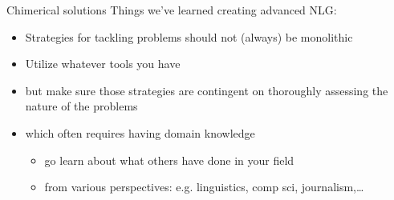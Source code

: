 \documentclass[10pt, compress]{beamer}
\begin{document}
\begin{frame}{Chimerical solutions}
	Things we've learned creating advanced NLG:

	\begin{itemize}
		\item Strategies for tackling problems should not (always) be monolithic
		\item Utilize whatever tools you have	\pause
		\item but make sure those strategies are contingent on thoroughly assessing the nature of the problems \pause
		\item which often requires having domain knowledge \pause
		\begin{itemize}
			\item go learn about what others have done in your field \pause
			\item from various perspectives: e.g. linguistics, comp sci, journalism,\ldots
		\end{itemize}
	\end{itemize}
\end{frame}









\end{document}
